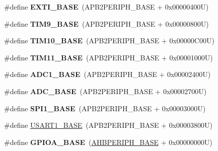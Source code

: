 \begin{DoxyCompactItemize}
\item 
\hypertarget{group___peripheral__memory__map_ga87371508b3bcdcd98cd1ec629be29061}{\#define {\bfseries E\-X\-T\-I\-\_\-\-B\-A\-S\-E}~(A\-P\-B2\-P\-E\-R\-I\-P\-H\-\_\-\-B\-A\-S\-E + 0x00000400\-U)}\label{group___peripheral__memory__map_ga87371508b3bcdcd98cd1ec629be29061}

\item 
\hypertarget{group___peripheral__memory__map_ga92ae902be7902560939223dd765ece08}{\#define {\bfseries T\-I\-M9\-\_\-\-B\-A\-S\-E}~(A\-P\-B2\-P\-E\-R\-I\-P\-H\-\_\-\-B\-A\-S\-E + 0x00000800\-U)}\label{group___peripheral__memory__map_ga92ae902be7902560939223dd765ece08}

\item 
\hypertarget{group___peripheral__memory__map_ga3eff32f3801db31fb4b61d5618cad54a}{\#define {\bfseries T\-I\-M10\-\_\-\-B\-A\-S\-E}~(A\-P\-B2\-P\-E\-R\-I\-P\-H\-\_\-\-B\-A\-S\-E + 0x00000\-C00\-U)}\label{group___peripheral__memory__map_ga3eff32f3801db31fb4b61d5618cad54a}

\item 
\hypertarget{group___peripheral__memory__map_ga3a4a06bb84c703084f0509e105ffaf1d}{\#define {\bfseries T\-I\-M11\-\_\-\-B\-A\-S\-E}~(A\-P\-B2\-P\-E\-R\-I\-P\-H\-\_\-\-B\-A\-S\-E + 0x00001000\-U)}\label{group___peripheral__memory__map_ga3a4a06bb84c703084f0509e105ffaf1d}

\item 
\hypertarget{group___peripheral__memory__map_ga695c9a2f892363a1c942405c8d351b91}{\#define {\bfseries A\-D\-C1\-\_\-\-B\-A\-S\-E}~(A\-P\-B2\-P\-E\-R\-I\-P\-H\-\_\-\-B\-A\-S\-E + 0x00002400\-U)}\label{group___peripheral__memory__map_ga695c9a2f892363a1c942405c8d351b91}

\item 
\hypertarget{group___peripheral__memory__map_gad06cb9e5985bd216a376f26f22303cd6}{\#define {\bfseries A\-D\-C\-\_\-\-B\-A\-S\-E}~(A\-P\-B2\-P\-E\-R\-I\-P\-H\-\_\-\-B\-A\-S\-E + 0x00002700\-U)}\label{group___peripheral__memory__map_gad06cb9e5985bd216a376f26f22303cd6}

\item 
\hypertarget{group___peripheral__memory__map_ga50cd8b47929f18b05efbd0f41253bf8d}{\#define {\bfseries S\-P\-I1\-\_\-\-B\-A\-S\-E}~(A\-P\-B2\-P\-E\-R\-I\-P\-H\-\_\-\-B\-A\-S\-E + 0x00003000\-U)}\label{group___peripheral__memory__map_ga50cd8b47929f18b05efbd0f41253bf8d}

\item 
\#define \hyperlink{group___peripheral__memory__map_ga86162ab3f740db9026c1320d46938b4d}{U\-S\-A\-R\-T1\-\_\-\-B\-A\-S\-E}~(A\-P\-B2\-P\-E\-R\-I\-P\-H\-\_\-\-B\-A\-S\-E + 0x00003800\-U)
\item 
\hypertarget{group___peripheral__memory__map_gad7723846cc5db8e43a44d78cf21f6efa}{\#define {\bfseries G\-P\-I\-O\-A\-\_\-\-B\-A\-S\-E}~(\hyperlink{group___peripheral__memory__map_ga92eb5d49730765d2abd0f5b09548f9f5}{A\-H\-B\-P\-E\-R\-I\-P\-H\-\_\-\-B\-A\-S\-E} + 0x00000000\-U)}\label{group___peripheral__memory__map_gad7723846cc5db8e43a44d78cf21f6efa}


\end{DoxyCompactItemize}
